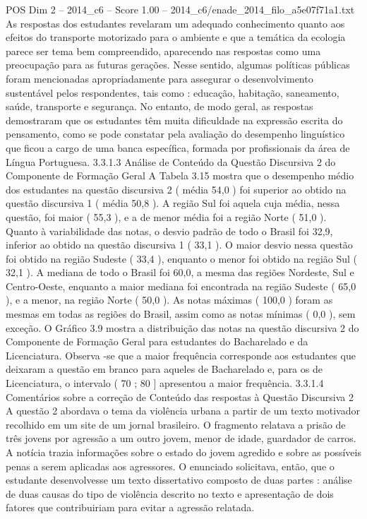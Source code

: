 \begin{textsample}{POS Dim 2 – 2014\_c6 – Score 1.00 – 2014\_c6/enade\_2014\_filo\_a5e07f71a1.txt}
As respostas dos estudantes revelaram um adequado conhecimento quanto aos efeitos do transporte motorizado para o ambiente e que a temática da ecologia parece ser tema bem compreendido, aparecendo nas respostas como uma preocupação para as futuras gerações.
Nesse sentido, algumas políticas públicas foram mencionadas apropriadamente para assegurar o desenvolvimento sustentável pelos respondentes, tais como : educação, habitação, saneamento, saúde, transporte e segurança.
No entanto, de modo geral, as respostas demostraram que os estudantes têm muita dificuldade na expressão escrita do pensamento, como se pode constatar pela avaliação do desempenho linguístico que ficou a cargo de uma banca específica, formada por profissionais da área de Língua Portuguesa. 3.3.1.3 Análise de Conteúdo da Questão Discursiva 2 do Componente de Formação Geral A Tabela 3.15 mostra que o desempenho médio dos estudantes na questão discursiva 2 ( média 54,0 ) foi superior ao obtido na questão discursiva 1 ( média 50,8 ).
A região Sul foi aquela cuja média, nessa questão, foi maior ( 55,3 ), e a de menor média foi a região Norte ( 51,0 ).
Quanto à variabilidade das notas, o desvio padrão de todo o Brasil foi 32,9, inferior ao obtido na questão discursiva 1 ( 33,1 ).
O maior desvio nessa questão foi obtido na região Sudeste ( 33,4 ), enquanto o menor foi obtido na região Sul ( 32,1 ).
A mediana de todo o Brasil foi 60,0, a mesma das regiões Nordeste, Sul e Centro-Oeste, enquanto a maior mediana foi encontrada na região Sudeste ( 65,0 ), e a menor, na região Norte ( 50,0 ).
As notas máximas ( 100,0 ) foram as mesmas em todas as regiões do Brasil, assim como as notas mínimas ( 0,0 ), sem exceção.
O Gráfico 3.9 mostra a distribuição das notas na questão discursiva 2 do Componente de Formação Geral para estudantes do Bacharelado e da Licenciatura.
Observa -se que a maior frequência corresponde aos estudantes que deixaram a questão em branco para aqueles de Bacharelado e, para os de Licenciatura, o intervalo ( 70 ; 80 ] apresentou a maior frequência. 3.3.1.4 Comentários sobre a correção de Conteúdo das respostas à Questão Discursiva 2 A questão 2 abordava o tema da violência urbana a partir de um texto motivador recolhido em um site de um jornal brasileiro.
O fragmento relatava a prisão de três jovens por agressão a um outro jovem, menor de idade, guardador de carros.
A notícia trazia informações sobre o estado do jovem agredido e sobre as possíveis penas a serem aplicadas aos agressores.
O enunciado solicitava, então, que o estudante desenvolvesse um texto dissertativo composto de duas partes : análise de duas causas do tipo de violência descrito no texto e apresentação de dois fatores que contribuiriam para evitar a agressão relatada.

\end{textsample}
